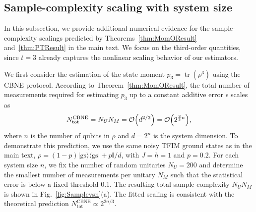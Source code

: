 \documentclass[aps,prl,twocolumn,nofootinbib,superscriptaddress,10pt]{revtex4-2}
\let\originalleft\left
\let\originalright\right
\renewcommand{\left}{\mathopen{}\mathclose\bgroup\originalleft}
\renewcommand{\right}{\aftergroup\egroup\originalright}
\DeclareMathOperator{\Tr}{tr}
\newcommand{\bigo}[1]{\mathcal{O}\left(#1\right)}
\theoremstyle{plain}
\theoremstyle{definition}
\newcommand{\tref}[1]{Theorem~\ref{#1}}
\begin{document}



\subsection{Sample-complexity scaling with system size}

In this subsection, we provide additional numerical evidence for the sample-complexity scalings predicted by Theorems~\ref{thm:MomOResult} and~\ref{thm:PTResult} in the main text. 
We focus on the third-order quantities, since \(t=3\) already captures the nonlinear scaling behavior of our estimators.

We first consider the estimation of the state moment \(p_3=\Tr(\rho^3)\) using the CBNE protocol. 
According to \tref{thm:MomOResult}, the total number of measurements required for estimating \(p_3\) up to a constant additive error \(\epsilon\) scales as
\begin{equation}
N_{\mathrm{tot}}^{\mathrm{CBNE}}
=N_U N_M=
\bigo{d^{2/3}}= \bigo{2^{\frac23 n}}, 
\end{equation}
where $n$ is the number of qubits in $\rho$ and $d=2^n$ is the system dimension. 
To demonstrate this prediction, we use the same noisy TFIM ground states as in the main text,
$\rho=(1-p)|\mathrm{gs}\rangle\langle\mathrm{gs}|+p\mathbb{I}/d$,
with \(J=h=1\) and \(p=0.2\). 
For each system size $n$, we fix the number of random unitaries \(N_U=200\) and determine the smallest number of measurements per unitary \(N_M\) such that the statistical error is below a fixed threshold 0.1. 
The resulting total sample complexity \(N_U N_M\) is shown in Fig.~\ref{fig:Samplevsn}(a). 
The fitted scaling is consistent with the theoretical prediction \(N_{\mathrm{tot}}^{\mathrm{CBNE}}\propto 2^{2n/3}\).
\end{document}
